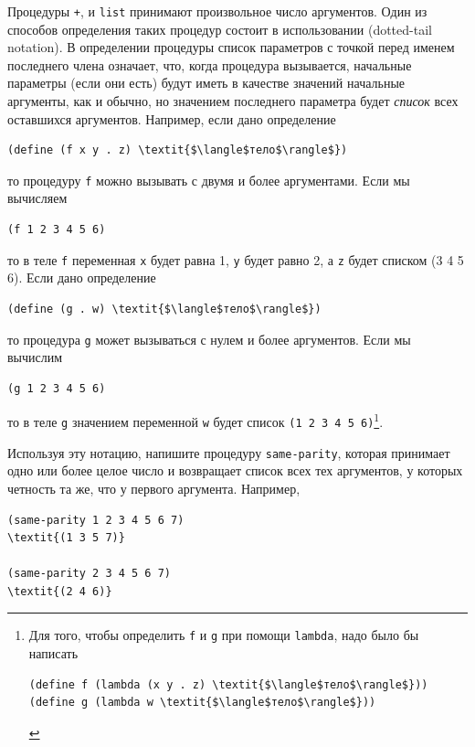 \begin{exercise}{2.20}\label{EX2.20}%
Процедуры {\tt +}, {\tt *} и
{\tt list} принимают    произвольное число
аргументов.  Один из  способов определения таких процедур состоит в
использовании   (dotted-tail notation). 
В определении процедуры список параметров с точкой перед 
именем последнего члена означает, что, когда процедура вызывается,
начальные параметры (если они есть) будут иметь в качестве значений
начальные аргументы, как и обычно, но значением последнего параметра
будет {\em список} всех оставшихся аргументов.  Например, если
дано определение
\begin{Verbatim}[fontsize=\small]
(define (f x y . z) \textit{$\langle$тело$\rangle$})
\end{Verbatim}
то процедуру {\tt f} можно вызывать с двумя и более
аргументами.  Если мы вычисляем

\begin{Verbatim}[fontsize=\small]
(f 1 2 3 4 5 6)
\end{Verbatim}
то в теле {\tt f} переменная {\tt x} будет равна 1,
{\tt y} будет равно 2, а {\tt z} будет списком (3 4 5
6).  Если дано определение

\begin{Verbatim}[fontsize=\small]
(define (g . w) \textit{$\langle$тело$\rangle$})
\end{Verbatim}
то процедура {\tt g} может вызываться с нулем и более
аргументов.  Если мы вычислим

\begin{Verbatim}[fontsize=\small]
(g 1 2 3 4 5 6)
\end{Verbatim}
то в теле {\tt g} значением переменной {\tt w} будет
список {\tt (1 2 3 4 5 6)}\footnote{Для того, чтобы определить {\tt f} и
{\tt g} при помощи {\tt lambda}, надо было бы написать


\begin{Verbatim}[fontsize=\footnotesize]
(define f (lambda (x y . z) \textit{$\langle$тело$\rangle$}))
(define g (lambda w \textit{$\langle$тело$\rangle$}))
\end{Verbatim}
}.

Используя эту нотацию, напишите процедуру
{\tt same-parity}, которая принимает одно или более целое число 
и возвращает список всех тех аргументов, у которых четность та же, что 
у первого аргумента. Например,

\begin{Verbatim}[fontsize=\small]
(same-parity 1 2 3 4 5 6 7)
\textit{(1 3 5 7)}

(same-parity 2 3 4 5 6 7)
\textit{(2 4 6)}
\end{Verbatim}
\end{exercise}

